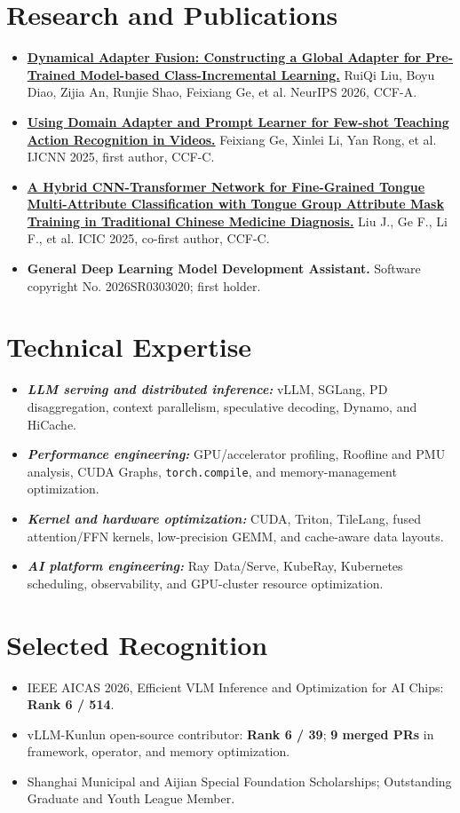 \documentclass[10pt,a4paper]{article}
\newcommand{\project}[1]{{\bfseries\itshape #1}}
\begin{document}
\section*{Research and Publications}
\begin{itemize}
    \item \href{https://openreview.net/pdf?id=cs7cFJRYLj}{\textbf{Dynamical Adapter Fusion: Constructing a Global Adapter for Pre-Trained Model-based Class-Incremental Learning.}} RuiQi Liu, Boyu Diao, Zijia An, Runjie Shao, Feixiang Ge, et al. NeurIPS 2026, CCF-A.
    \item \href{https://doi.org/10.1109/IJCNN64981.2025.11227768}{\textbf{Using Domain Adapter and Prompt Learner for Few-shot Teaching Action Recognition in Videos.}} Feixiang Ge, Xinlei Li, Yan Rong, et al. IJCNN 2025, first author, CCF-C.
    \item \href{https://doi.org/10.1007/978-981-96-9891-2_39}{\textbf{A Hybrid CNN-Transformer Network for Fine-Grained Tongue Multi-Attribute Classification with Tongue Group Attribute Mask Training in Traditional Chinese Medicine Diagnosis.}} Liu J., Ge F., Li F., et al. ICIC 2025, co-first author, CCF-C.
    \item \textbf{General Deep Learning Model Development Assistant.} Software copyright No. 2026SR0303020; first holder.
\end{itemize}

\section*{Technical Expertise}
\begin{itemize}
    \item \project{LLM serving and distributed inference:} vLLM, SGLang, PD disaggregation, context parallelism, speculative decoding, Dynamo, and HiCache.
    \item \project{Performance engineering:} GPU/accelerator profiling, Roofline and PMU analysis, CUDA Graphs, \texttt{torch.compile}, and memory-management optimization.
    \item \project{Kernel and hardware optimization:} CUDA, Triton, TileLang, fused attention/FFN kernels, low-precision GEMM, and cache-aware data layouts.
    \item \project{AI platform engineering:} Ray Data/Serve, KubeRay, Kubernetes scheduling, observability, and GPU-cluster resource optimization.
\end{itemize}

\section*{Selected Recognition}
\begin{itemize}
    \item IEEE AICAS 2026, Efficient VLM Inference and Optimization for AI Chips: \textbf{Rank 6 / 514}.
    \item vLLM-Kunlun open-source contributor: \textbf{Rank 6 / 39}; \textbf{9 merged PRs} in framework, operator, and memory optimization.
    \item Shanghai Municipal and Aijian Special Foundation Scholarships; Outstanding Graduate and Youth League Member.
\end{itemize}
\end{document}
